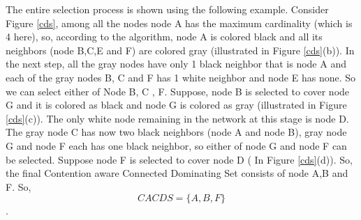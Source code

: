 The entire selection process is shown using the following example. Consider Figure \ref{cds}, among all the nodes node A has the maximum cardinality (which is 4 here), so, according to the algorithm, node A is colored black and all its neighbors (node B,C,E and F) are colored gray (illustrated in Figure \ref{cds}(b)). In the next step, all the gray nodes have only 1 black neighbor that is node A and each of the gray nodes B, C and F has 1 white neighbor and node E has none. So we can select either of Node B, C , F. Suppose, node B is selected to cover node G and it is colored as black and node G is colored as gray (illustrated in Figure \ref{cds}(c)). The only white node remaining in the network at this stage is node D. The gray node C has now two black neighbors (node A and node B), gray node G and node F each has one black neighbor, so either of node G and node F can be selected. Suppose node F is selected to cover node D ( In Figure \ref{cds}(d)). So, the final Contention aware Connected Dominating Set consists of node A,B and F. So, $$CACDS = \{A,B,F\}$$.

